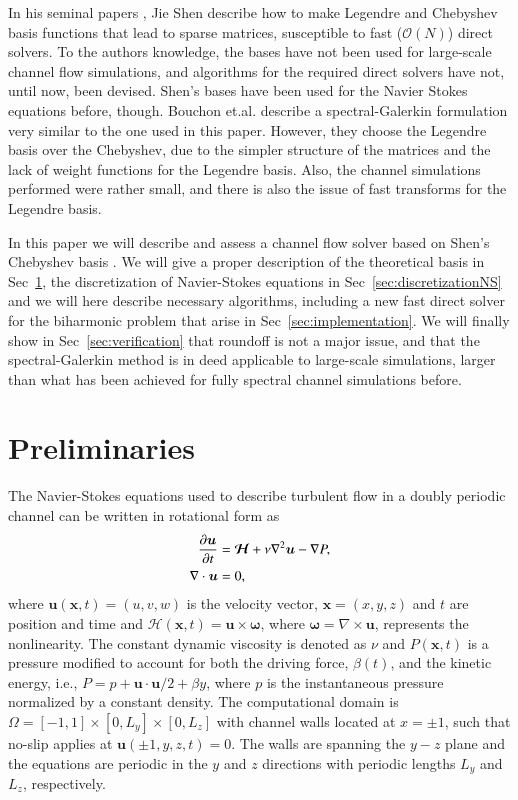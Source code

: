\documentclass[preprint]{elsarticle}
\begin{document}
In his seminal papers \cite{Shen94,Shen95}, Jie Shen describe how to make Legendre and Chebyshev basis functions that lead to sparse matrices, susceptible to fast ($\mathcal{O}(N)$) direct solvers. To the authors knowledge, the bases have not been used for large-scale channel flow simulations, and algorithms for the required direct solvers have not, until now, been devised. Shen's bases have been used for the Navier Stokes equations before, though. Bouchon et.al.  \cite{Bouchon01} describe a spectral-Galerkin formulation very similar to the one used in this paper. However, they choose the Legendre basis over the Chebyshev, due to the simpler structure of the matrices and the lack of weight functions for the Legendre basis. Also, the channel simulations performed were rather small, and there is also the issue of fast transforms for the Legendre basis.

In this paper we will describe and assess a channel flow solver based on Shen's Chebyshev basis \cite{Shen95}. We will give a proper description of the theoretical basis in Sec~\ref{sec:prelim}, the discretization of Navier-Stokes equations in Sec~\ref{sec:discretizationNS} and we will here describe necessary algorithms, including a new fast direct solver for the biharmonic problem that arise in Sec~\ref{sec:implementation}. We will finally show in Sec~\ref{sec:verification} that roundoff is not a major issue, and that the spectral-Galerkin method is in deed applicable to large-scale simulations, larger than what has been achieved for fully spectral channel simulations before.

\section{Preliminaries}
\label{sec:prelim}
The Navier-Stokes equations used to describe turbulent flow in a doubly 
periodic channel can be written in rotational form as
\begin{align}
 \frac{\partial \bm{u}}{\partial t}   &= \bm{\mathcal{H}} + \nu 
 \nabla^2 \bm{u} - \nabla{P}, \notag \\
 \nabla \cdot \bm{u} &= 0, \label{eq:NS}
\end{align}
where $\bm{u}(\bm{x}, t)=(u, v, w)$ is the velocity vector, $\bm{x}=(x, y, z)$ 
and $t$ are position and time and $\bm{\mathcal{H}}(\bm{x}, t) = \bm{u}\times 
\bm{\omega}$, where $\bm{\omega} = \nabla \times \bm{u}$, represents 
the nonlinearity.  The constant dynamic viscosity is denoted as $\nu$ 
and $P(\bm{x}, t)$ is a pressure modified to account for both the driving force, $\beta(t)$, and the kinetic energy, i.e., $P = p + \bm{u} \cdot \bm{u}/2 + \beta y$, where $p$ is the instantaneous 
pressure normalized by a constant density. The computational domain is 
$\Omega=[-1, 1]\times [0, L_y] \times [0, L_z]$ with channel walls 
located at $x=\pm 1$, such that no-slip applies at 
$ \bm{u}(\pm 1, y, z, t) = 0$. The walls are spanning 
the $y-z$ plane and the equations are periodic in the $y$ and $z$ directions with periodic lengths $L_y$ and $L_z$, respectively.
\end{document}
